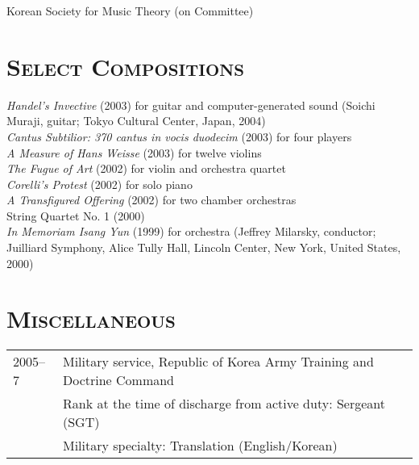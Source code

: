 \documentclass[letter,11pt]{article}
\begin{document}
  \noindent Korean Society for Music Theory (on Committee)
  
%  
%  
%  
%  
  \section*{\textsc{Select Compositions}}
  
  \begin{hangparas}{15pt}{1}
    \textit{Handel’s Invective} (2003) for guitar and computer-generated sound (Soichi Muraji, guitar; Tokyo Cultural Center, Japan, 2004)\\[2mm]
  
    \textit{Cantus Subtilior: 370 cantus in vocis duodecim} (2003) for four players\\[2mm]
  
    \textit{A Measure of Hans Weisse} (2003) for twelve violins\\[2mm]
  
    \textit{The Fugue of Art} (2002) for violin and orchestra quartet\\[2mm]
  
    \textit{Corelli’s Protest} (2002) for solo piano\\[2mm]
  
    \textit{A Transfigured Offering} (2002) for two chamber orchestras\\[2mm]
  
    String Quartet No. 1 (2000)\\[2mm]
  
    \textit{In Memoriam Isang Yun} (1999) for orchestra (Jeffrey Milarsky, conductor; Juilliard Symphony, Alice Tully Hall, Lincoln Center, New York, United States, 2000)
  \end{hangparas}
  
  \vspace{5mm}
  
  \section*{\textsc{Miscellaneous}}
  
  \hspace*{-0.25cm}
  \begin{tabular}{p{2.5cm} l}
    2005–7 & Military service, Republic of Korea Army Training and Doctrine Command\\
    & Rank at the time of discharge from active duty: Sergeant (SGT)\\
    & Military specialty: Translation (English/Korean)
  \end{tabular}
\end{document}
